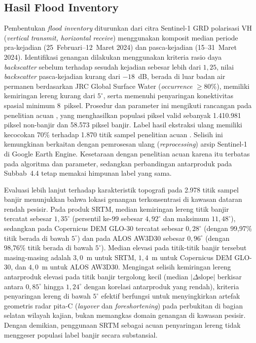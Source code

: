 \documentclass[12pt]{article}
\begin{document}
\subsection{Hasil Flood Inventory}

Pembentukan \textit{flood inventory} diturunkan dari citra Sentinel-1 GRD
polarisasi VH (\textit{vertical transmit, horizontal receive}) menggunakan komposit median periode pra-kejadian
(25~Februari--12~Maret 2024) dan pasca-kejadian (15--31~Maret 2024).
Identifikasi genangan dilakukan menggunakan kriteria rasio daya
\textit{backscatter} sebelum terhadap sesudah kejadian sebesar lebih dari
$1{,}25$, nilai \textit{backscatter} pasca-kejadian kurang dari $-18$~dB,
berada di luar badan air permanen berdasarkan JRC Global Surface Water
(\textit{occurrence} $\geq 80\%$), memiliki kemiringan lereng kurang dari
$5^{\circ}$, serta memenuhi penyaringan konektivitas spasial minimum 8~piksel.
Prosedur dan parameter ini mengikuti rancangan pada penelitian acuan
\cite{hakim2026}, yang menghasilkan populasi piksel valid sebanyak 1.410.981
piksel non-banjir dan 58.573 piksel banjir. Label hasil ekstraksi ulang memiliki kecocokan 70\% terhadap 1.870 titik
sampel penelitian acuan \cite{hakim2026}. Selisih ini kemungkinan berkaitan
dengan pemrosesan ulang (\textit{reprocessing}) arsip Sentinel-1 di Google
Earth Engine. Kesetaraan dengan penelitian acuan karena itu terbatas pada
algoritma dan parameter, sedangkan perbandingan antarproduk pada
Subbab~4.4 tetap memakai himpunan label yang sama.

Evaluasi lebih lanjut terhadap karakteristik topografi pada 2.978 titik sampel
banjir menunjukkan bahwa lokasi genangan terkonsentrasi di kawasan dataran
rendah pesisir. Pada produk SRTM, median kemiringan lereng titik banjir
tercatat sebesar $1{,}35^{\circ}$ (persentil ke-99 sebesar $4{,}92^{\circ}$
dan maksimum $11{,}48^{\circ}$), sedangkan pada Copernicus DEM GLO-30 tercatat
sebesar $0{,}28^{\circ}$ (dengan 99,97\% titik berada di bawah $5^{\circ}$)
dan pada ALOS AW3D30 sebesar $0{,}96^{\circ}$ (dengan 98,76\% titik berada di
bawah $5^{\circ}$). Median elevasi pada titik-titik banjir tersebut
masing-masing adalah $3{,}0$~m untuk SRTM, $1{,}4$~m untuk Copernicus DEM
GLO-30, dan $4{,}0$~m untuk ALOS AW3D30. Mengingat selisih kemiringan lereng
antarproduk elevasi pada titik banjir tergolong kecil (median
$|\Delta\text{slope}|$ berkisar antara $0{,}85^{\circ}$ hingga $1{,}24^{\circ}$
dengan korelasi antarproduk yang rendah), kriteria penyaringan lereng di bawah
$5^{\circ}$ efektif berfungsi untuk menyingkirkan artefak geometris radar
pita-C (\textit{layover} dan \textit{foreshortening}) pada perbukitan di
bagian selatan wilayah kajian, bukan memangkas domain genangan di kawasan
pesisir. Dengan demikian, penggunaan SRTM sebagai acuan penyaringan lereng
tidak menggeser populasi label banjir secara substansial.
\end{document}
